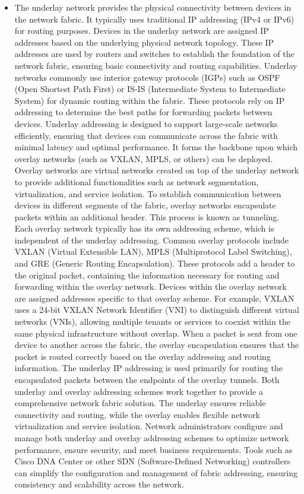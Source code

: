 \documentclass{article}
\begin{document}
\begin{itemize}
	\item[] The underlay network provides the physical connectivity between devices in the network fabric. It typically uses traditional IP addressing (IPv4 or IPv6) for routing purposes. Devices in the underlay network are assigned IP addresses based on the underlying physical network topology. These IP addresses are used by routers and switches to establish the foundation of the network fabric, ensuring basic connectivity and routing capabilities. Underlay networks commonly use interior gateway protocols (IGPs) such as OSPF (Open Shortest Path First) or IS-IS (Intermediate System to Intermediate System) for dynamic routing within the fabric. These protocols rely on IP addressing to determine the best paths for forwarding packets between devices. Underlay addressing is designed to support large-scale networks efficiently, ensuring that devices can communicate across the fabric with minimal latency and optimal performance. It forms the backbone upon which overlay networks (such as VXLAN, MPLS, or others) can be deployed. Overlay networks are virtual networks created on top of the underlay network to provide additional functionalities such as network segmentation, virtualization, and service isolation. To establish communication between devices in different segments of the fabric, overlay networks encapsulate packets within an additional header. This process is known as tunneling. Each overlay network typically has its own addressing scheme, which is independent of the underlay addressing. Common overlay protocols include VXLAN (Virtual Extensible LAN), MPLS (Multiprotocol Label Switching), and GRE (Generic Routing Encapsulation). These protocols add a header to the original packet, containing the information necessary for routing and forwarding within the overlay network. Devices within the overlay network are assigned addresses specific to that overlay scheme. For example, VXLAN uses a 24-bit VXLAN Network Identifier (VNI) to distinguish different virtual networks (VNIs), allowing multiple tenants or services to coexist within the same physical infrastructure without overlap. When a packet is sent from one device to another across the fabric, the overlay encapsulation ensures that the packet is routed correctly based on the overlay addressing and routing information. The underlay IP addressing is used primarily for routing the encapsulated packets between the endpoints of the overlay tunnels. Both underlay and overlay addressing schemes work together to provide a comprehensive network fabric solution. The underlay ensures reliable connectivity and routing, while the overlay enables flexible network virtualization and service isolation. Network administrators configure and manage both underlay and overlay addressing schemes to optimize network performance, ensure security, and meet business requirements. Tools such as Cisco DNA Center or other SDN (Software-Defined Networking) controllers can simplify the configuration and management of fabric addressing, ensuring consistency and scalability across the network.
  

\end{itemize}
\end{document}
